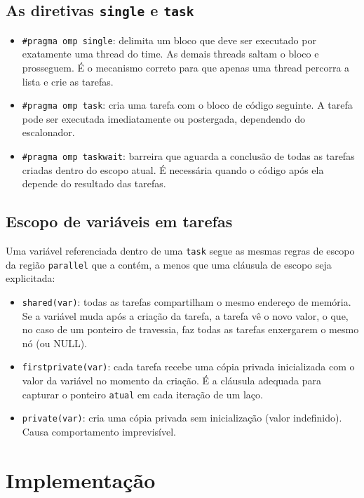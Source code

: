 \documentclass[11pt,letterpaper]{article}
\begin{document}
\subsection{As diretivas \texttt{single} e \texttt{task}}
\begin{itemize}
    \item \texttt{\#pragma omp single}: delimita um bloco que deve ser executado por exatamente uma thread do time. As demais threads saltam o bloco e prosseguem. É o mecanismo correto para que apenas uma thread percorra a lista e crie as tarefas.
    \item \texttt{\#pragma omp task}: cria uma tarefa com o bloco de código seguinte. A tarefa pode ser executada imediatamente ou postergada, dependendo do escalonador.
    \item \texttt{\#pragma omp taskwait}: barreira que aguarda a conclusão de todas as tarefas criadas dentro do escopo atual. É necessária quando o código após ela depende do resultado das tarefas.
\end{itemize}

\subsection{Escopo de variáveis em tarefas}
Uma variável referenciada dentro de uma \texttt{task} segue as mesmas regras de escopo da região \texttt{parallel} que a contém, a menos que uma cláusula de escopo seja explicitada:
\begin{itemize}
    \item \texttt{shared(var)}: todas as tarefas compartilham o mesmo endereço de memória. Se a variável muda após a criação da tarefa, a tarefa vê o novo valor, o que, no caso de um ponteiro de travessia, faz todas as tarefas enxergarem o mesmo nó (ou NULL).
    \item \texttt{firstprivate(var)}: cada tarefa recebe uma cópia privada inicializada com o valor da variável no momento da criação. É a cláusula adequada para capturar o ponteiro \texttt{atual} em cada iteração de um laço.
    \item \texttt{private(var)}: cria uma cópia privada sem inicialização (valor indefinido). Causa comportamento imprevisível.
\end{itemize}

\section{Implementação}
\end{document}
